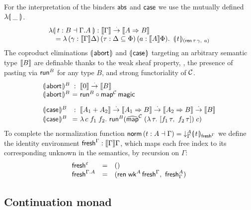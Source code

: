 \documentclass[sigplan,screen]{acmart}
\begin{document}
For the interpretation of the binders $\mathsf{abs}$ and $\mathsf{case}$ we use the
mutually defined $\fden{\_}$.
\[
\begin{array}{l}
  \fden{t : B \from \cext \Gamma A}
    : \den \Gamma \todot \den{A \To B} \\
    \quad =
      \lambda\, (\gamma : \den \Gamma \Delta)
      \,(\tau : \Delta \sublist \Phi)
      \,(a : \den A \Phi)
      .\ \,
      \dent t {(\tren\,\tau\,\gamma,\ a)} \\
\end{array}
\]
The coproduct eliminations $\llparenthesis\kern0.3ex\mathsf{abort}\kern0.3ex\rrparenthesis$ and $\llparenthesis\kern0.3ex\mathsf{case}\kern0.3ex\rrparenthesis$
targeting an arbitrary semantic type $\mathopen{{[\kern-0.14em[}} B \mathclose{{]\kern-0.14em]}}$ are definable thanks to
the weak sheaf property, \ie, the presence of pasting via $\mathsf{run}^B$
for any type $B$, and strong functoriality of $\mathcal{C}$.
\[
\begin{array}{l@{~}c@{~}l}
  \denabort^B & : & \den \tyzero \todot \den B \\
  \denabort^B & = & \trun^B \comp \tmap[\C]\,\tmagic
\\[2ex]
  \dencase^B  & : & \den{A_1 + A_2}
    \todot \den{A_1 \To B}
    \todot \den{A_2 \To B}
    \todot \den{B} \\
  \dencase^B & = & \lambda\,c\;f_1\;f_2.\
    \trun^B (\stmap[\C]\;(\lambda\,\tau.\ [f_1\,\tau,\ f_2\,\tau])\;c) \\
\end{array}
\]
To complete the normalization function
$\mathsf{norm}\,(t : A \dashv \Gamma) = \mathord{\downarrow_{\Gamma}^{A}} \llparenthesis\kern0.3ext\kern0.3ex\rrparenthesis_{\mathsf{fresh}^{\Gamma}}$
we define the identity environment $\mathsf{fresh}^{\Gamma} : \mathopen{{[\kern-0.14em[}} \Gamma \mathclose{{]\kern-0.14em]}} \Gamma$,
which maps each free index to its corresponding unknown in the
semantics, by recursion on $\Gamma$:
\[
\begin{array}{lcl}
  \mathsf{fresh}^{\varepsilon} & = & () \\
  \mathsf{fresh}^{\Gamma.A} & = & (\mathsf{ren}\;\mathsf{wk}^A\,\mathsf{fresh}^{\Gamma}, \  \mathsf{fresh}^A_\Gamma)\\
\end{array}
\]

\subsection{Continuation monad}
\end{document}

